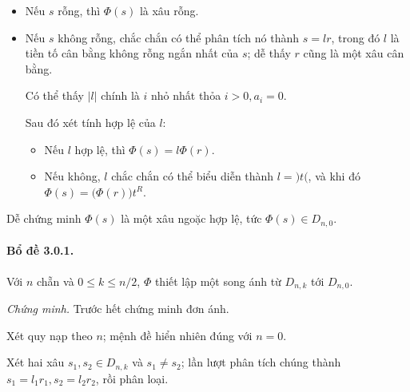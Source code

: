 \documentclass[11pt]{article}
\begin{document}
\begin{itemize}
  \item Nếu $s$ rỗng, thì $\Phi(s)$ là xâu rỗng.
  \item Nếu $s$ không rỗng, chắc chắn có thể phân tích nó thành $s=lr$, trong
  đó $l$ là tiền tố cân bằng không rỗng ngắn nhất của $s$; dễ thấy $r$ cũng là
  một xâu cân bằng.

  Có thể thấy $|l|$ chính là $i$ nhỏ nhất thỏa $i>0,a_i=0$.

  Sau đó xét tính hợp lệ của $l$:
  \begin{itemize}
    \item Nếu $l$ hợp lệ, thì $\Phi(s)=l\Phi(r)$.
    \item Nếu không, $l$ chắc chắn có thể biểu diễn thành $l=\texttt{)}t\texttt{(}$,
    và khi đó $\Phi(s)=\texttt{(}\Phi(r)\texttt{)}t^R$.
  \end{itemize}
\end{itemize}

Dễ chứng minh $\Phi(s)$ là một xâu ngoặc hợp lệ, tức $\Phi(s)\in D_{n,0}$.

\paragraph{Bổ đề 3.0.1.}
Với $n$ chẵn và $0\le k\le n/2$, $\Phi$ thiết lập một song ánh từ $D_{n,k}$ tới
$D_{n,0}$.

\emph{Chứng minh.}
Trước hết chứng minh đơn ánh.

Xét quy nạp theo $n$; mệnh đề hiển nhiên đúng với $n=0$.

Xét hai xâu $s_1,s_2\in D_{n,k}$ và $s_1\ne s_2$; lần lượt phân tích chúng
thành $s_1=l_1r_1,s_2=l_2r_2$, rồi phân loại.
\end{document}
